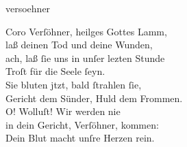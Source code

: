 \documentclass[shorttitlesize=55,tocstyle=ref-genre]{ees}
\begin{document}
{\begin{movement}{versoehner}
  \item[Coro]
  Verſöhner, heilges Gottes Lamm,\\
  laß deinen Tod und deine Wunden,\\
  ach, laß ſie uns in unſer lezten Stunde\\
  Troſt für die Seele ſeyn.\\
  Sie bluten jtzt, bald ſtrahlen ſie,\\
  Gericht dem Sünder, Huld dem Frommen.\\
  O! Wolluſt! Wir werden nie\\
  in dein Gericht, Verſöhner, kommen:\\
  Dein Blut macht unſre Herzen rein.
\end{movement}
}

\eesScore
\end{document}
